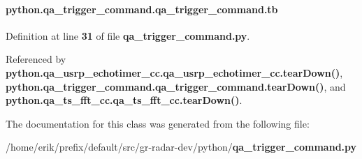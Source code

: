 \paragraph[{tb}]{\setlength{\rightskip}{0pt plus 5cm}python.\+qa\+\_\+trigger\+\_\+command.\+qa\+\_\+trigger\+\_\+command.\+tb}\label{classpython_1_1qa__trigger__command_1_1qa__trigger__command_a78ca5621a665673d401b5efd4c770bf0}


Definition at line {\bf 31} of file {\bf qa\+\_\+trigger\+\_\+command.\+py}.



Referenced by {\bf python.\+qa\+\_\+usrp\+\_\+echotimer\+\_\+cc.\+qa\+\_\+usrp\+\_\+echotimer\+\_\+cc.\+tear\+Down()}, {\bf python.\+qa\+\_\+trigger\+\_\+command.\+qa\+\_\+trigger\+\_\+command.\+tear\+Down()}, and {\bf python.\+qa\+\_\+ts\+\_\+fft\+\_\+cc.\+qa\+\_\+ts\+\_\+fft\+\_\+cc.\+tear\+Down()}.



The documentation for this class was generated from the following file\+:\begin{DoxyCompactItemize}
\item 
/home/erik/prefix/default/src/gr-\/radar-\/dev/python/{\bf qa\+\_\+trigger\+\_\+command.\+py}\end{DoxyCompactItemize}
